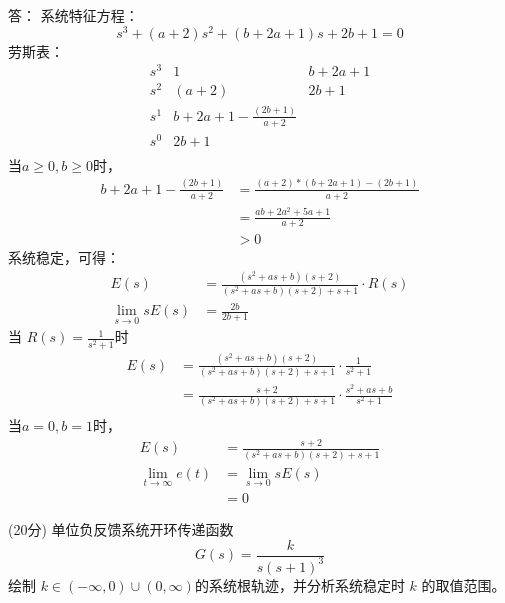 \onlyanswer
{
答：
系统特征方程：
$$ s^3+(a+2)s^2 +(b+2a+1)s+2b+1=0 $$
劳斯表：
$$
\begin{matrix}
s^3 &  1       &  b+2a+1   \\
s^2 & (a+2) & 2b+1 \\
s^1 & b+2a+1-\frac{(2b+1)}{a+2} \\
s^0 & 2b+1 \\
\end{matrix}
$$
当$a\geq 0,b\geq 0$时，
\begin{align*}
 b+2a+1-\frac{(2b+1)}{a+2}&=\frac{ (a+2)*(b+2a+1)-(2b+1)}{a+2} \\
 &=\frac{ab+2a^2+5a+1}{a+2} \\
 &> 0
\end{align*}
系统稳定，可得：
\begin{align*}
E(s) &=\frac{(s^2+as+b)(s+2)}{(s^2+as+b)(s+2)+s+1}\cdot R(s) \\
\lim_{s\rightarrow 0} sE(s)&=\frac{2b}{2b+1}
\end{align*}
当 $R(s)=\frac{1}{s^2+1}$时
\begin{align*}
E(s) &=\frac{(s^2+as+b)(s+2)}{(s^2+as+b)(s+2)+s+1}\cdot \frac{1}{s^2+1}\\
&=\frac{s+2}{(s^2+as+b)(s+2)+s+1}\cdot\frac{s^2+as+b}{s^2+1} \\
\end{align*}
当$a=0,b=1$时，
\begin{align*}
E(s) &=\frac{s+2}{(s^2+as+b)(s+2)+s+1} \\
\lim_{t\rightarrow\infty}e(t) &=\lim_{s\rightarrow 0} sE(s)\\
&=0
\end{align*}
}

\question  (20分) 单位负反馈系统开环传递函数
$$G(s)=\frac{k}{s(s+1)^3}$$
绘制 $k\in(-\infty,0)\cup(0,\infty)$的系统根轨迹，并分析系统稳定时 $k$ 的取值范围。

